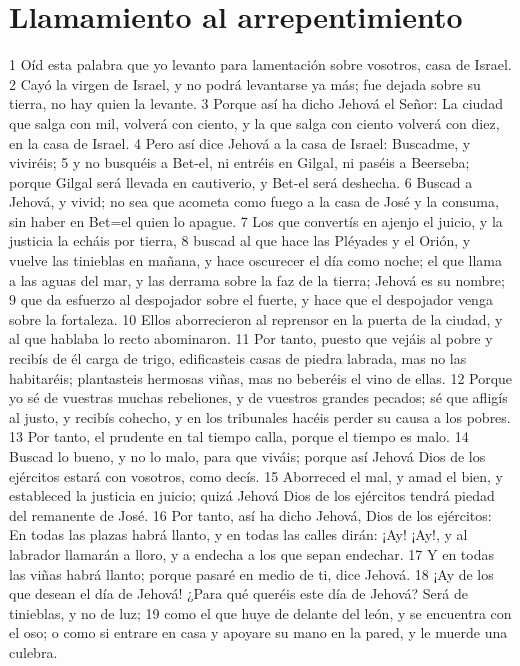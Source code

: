 \section*{Llamamiento al arrepentimiento}

1 Oíd esta palabra que yo levanto para lamentación sobre vosotros, casa de Israel.
2 Cayó la virgen de Israel, y no podrá levantarse ya más; fue dejada sobre su tierra, no hay quien la levante.
3 Porque así ha dicho Jehová el Señor: La ciudad que salga con mil, volverá con ciento, y la que salga con ciento volverá con diez, en la casa de Israel.
4 Pero así dice Jehová a la casa de Israel: Buscadme, y viviréis;
5 y no busquéis a Bet-el, ni entréis en Gilgal, ni paséis a Beerseba; porque Gilgal será llevada en cautiverio, y Bet-el será deshecha.
6 Buscad a Jehová, y vivid; no sea que acometa como fuego a la casa de José y la consuma, sin haber en Bet=el quien lo apague.
7 Los que convertís en ajenjo el juicio, y la justicia la echáis por tierra,
8 buscad al que hace las Pléyades y el Orión, y vuelve las tinieblas en mañana, y hace oscurecer el día como noche; el que llama a las aguas del mar, y las derrama sobre la faz de la tierra; Jehová es su nombre;
9 que da esfuerzo al despojador sobre el fuerte, y hace que el despojador venga sobre la fortaleza.
10 Ellos aborrecieron al reprensor en la puerta de la ciudad, y al que hablaba lo recto abominaron.
11 Por tanto, puesto que vejáis al pobre y recibís de él carga de trigo, edificasteis casas de piedra labrada, mas no las habitaréis; plantasteis hermosas viñas, mas no beberéis el vino de ellas.
12 Porque yo sé de vuestras muchas rebeliones, y de vuestros grandes pecados; sé que afligís al justo, y recibís cohecho, y en los tribunales hacéis perder su causa a los pobres.
13 Por tanto, el prudente en tal tiempo calla, porque el tiempo es malo.
14 Buscad lo bueno, y no lo malo, para que viváis; porque así Jehová Dios de los ejércitos estará con vosotros, como decís.
15 Aborreced el mal, y amad el bien, y estableced la justicia en juicio; quizá Jehová Dios de los ejércitos tendrá piedad del remanente de José.
16 Por tanto, así ha dicho Jehová, Dios de los ejércitos: En todas las plazas habrá llanto, y en todas las calles dirán: ¡Ay! ¡Ay!, y al labrador llamarán a lloro, y a endecha a los que sepan endechar.
17 Y en todas las viñas habrá llanto; porque pasaré en medio de ti, dice Jehová.
18 ¡Ay de los que desean el día de Jehová! ¿Para qué queréis este día de Jehová? Será de tinieblas, y no de luz;
19 como el que huye de delante del león, y se encuentra con el oso; o como si entrare en casa y apoyare su mano en la pared, y le muerde una culebra.
